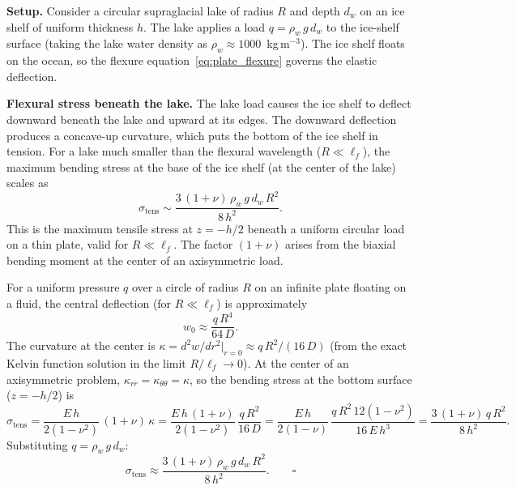 \documentclass[11pt]{article}
\begin{document}
\medskip
\noindent\textbf{Setup.}  Consider a circular supraglacial lake of radius $R$ and depth $d_w$ on an ice shelf of uniform thickness $h$.  The lake applies a load $q = \rho_w\,g\,d_w$ to the ice-shelf surface (taking the lake water density as $\rho_w \approx 1000$~kg\,m$^{-3}$).  The ice shelf floats on the ocean, so the flexure equation~\eqref{eq:plate_flexure} governs the elastic deflection.

\medskip
\noindent\textbf{Flexural stress beneath the lake.}  The lake load causes the ice shelf to deflect downward beneath the lake and upward at its edges.  The downward deflection produces a concave-up curvature, which puts the bottom of the ice shelf in tension.  For a lake much smaller than the flexural wavelength ($R \ll \ell_f$), the maximum bending stress at the base of the ice shelf (at the center of the lake) scales as
\begin{equation}
  \sigma_{\text{tens}} \sim \frac{3\,(1+\nu)\,\rho_w\,g\,d_w\,R^2}{8\,h^2}.
  \label{eq:lake_stress}
\end{equation}
This is the maximum tensile stress at $z = -h/2$ beneath a uniform circular load on a thin plate, valid for $R \ll \ell_f$.  The factor $(1+\nu)$ arises from the biaxial bending moment at the center of an axisymmetric load.

\begin{tcolorbox}[
  colback=orange!25,
  colframe=orange!70!black,
  title={\textbf{Derivation: flexural stress beneath a circular lake load}}
]
For a uniform pressure $q$ over a circle of radius $R$ on an infinite plate floating on a fluid, the central deflection (for $R \ll \ell_f$) is approximately
\[
  w_0 \approx \frac{q\,R^4}{64\,D}.
\]
The curvature at the center is $\kappa = d^2w/dr^2|_{r=0} \approx q\,R^2/(16\,D)$ (from the exact Kelvin function solution in the limit $R/\ell_f \to 0$).  At the center of an axisymmetric problem, $\kappa_{rr} = \kappa_{\theta\theta} = \kappa$, so the bending stress at the bottom surface ($z = -h/2$) is
\[
  \sigma_{\text{tens}} = \frac{E\,h}{2(1-\nu^2)}\,(1+\nu)\,\kappa = \frac{E\,h\,(1+\nu)}{2(1-\nu^2)}\,\frac{q\,R^2}{16\,D} = \frac{E\,h}{2(1-\nu)}\,\frac{q\,R^2\,12(1-\nu^2)}{16\,E\,h^3} = \frac{3\,(1+\nu)\,q\,R^2}{8\,h^2}.
\]
Substituting $q = \rho_w\,g\,d_w$:
\[
  \sigma_{\text{tens}} \approx \frac{3\,(1+\nu)\,\rho_w\,g\,d_w\,R^2}{8\,h^2}. \qquad \square
\]
\end{tcolorbox}
\end{document}
